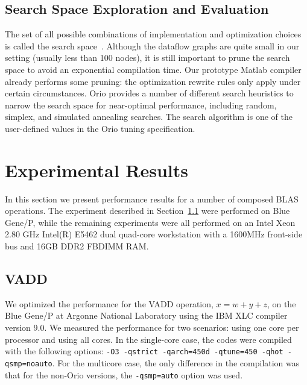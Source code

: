 \documentclass[11pt]{article}
\begin{document}
\subsection{Search Space Exploration and Evaluation}
\label{sec:search}

The set of all possible combinations of implementation and optimization choices is called the search space~\cite{Kisuki:2000uq,Triantafyllis:2003uq, Cooper:2005kx}.  Although the dataflow graphs are quite small in our setting (usually less than 100 nodes), it is still important to prune the search space to avoid an exponential compilation time. Our prototype Matlab compiler already performs some pruning: the optimization rewrite rules only apply under certain circumstances. 
%
%
Orio provides a number of different search heuristics to narrow the search space for near-optimal performance, including random, simplex, and simulated annealing searches. The search algorithm is one of the user-defined values in the Orio tuning specification.



\section{Experimental Results}
\label{sec:experiments}

In this section we present performance results for a number of composed BLAS operations. The experiment described in Section~\ref{sec:vadd} were performed on Blue Gene/P, while the remaining experiments were all performed on an Intel Xeon 2.80 GHz Intel(R) E5462 dual quad-core workstation with a 1600MHz front-side bus and 16GB DDR2 FBDIMM RAM. 


\subsection{VADD}
\label{sec:vadd}

We optimized the performance for the VADD operation, $x = w + y + z$, on the Blue Gene/P at Argonne National Laboratory using the IBM XLC compiler version 9.0. We measured the performance for two scenarios: using one core per processor and using all cores. In the single-core case, the codes were compiled with the following options: \texttt{-O3 -qstrict -qarch=450d -qtune=450 -qhot -qsmp=noauto}. For the multicore case, the only difference in the compilation was that for the non-Orio versions, the \texttt{-qsmp=auto} option was used.
\end{document}
